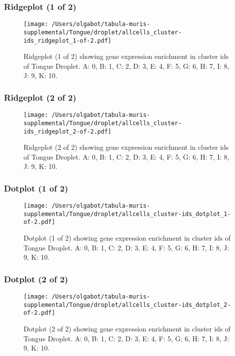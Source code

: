 \clearpage
\clearpage
\subsubsection{Ridgeplot (1 of 2)}
\begin{figure}[h]
\centering
\texttt{[image: /Users/olgabot/tabula-muris-supplemental/Tongue/droplet/allcells\_cluster-ids\_ridgeplot\_1-of-2.pdf]}

\caption{ Ridgeplot (1 of 2)  showing gene expression enrichment in cluster ids of Tongue Droplet. A: 0, B: 1, C: 2, D: 3, E: 4, F: 5, G: 6, H: 7, I: 8, J: 9, K: 10.}
\end{figure}


\clearpage
\clearpage
\subsubsection{Ridgeplot (2 of 2)}
\begin{figure}[h]
\centering
\texttt{[image: /Users/olgabot/tabula-muris-supplemental/Tongue/droplet/allcells\_cluster-ids\_ridgeplot\_2-of-2.pdf]}

\caption{ Ridgeplot (2 of 2)  showing gene expression enrichment in cluster ids of Tongue Droplet. A: 0, B: 1, C: 2, D: 3, E: 4, F: 5, G: 6, H: 7, I: 8, J: 9, K: 10.}
\end{figure}


\clearpage
\clearpage
\subsubsection{Dotplot (1 of 2)}
\begin{figure}[h]
\centering
\texttt{[image: /Users/olgabot/tabula-muris-supplemental/Tongue/droplet/allcells\_cluster-ids\_dotplot\_1-of-2.pdf]}

\caption{ Dotplot (1 of 2)  showing gene expression enrichment in cluster ids of Tongue Droplet. A: 0, B: 1, C: 2, D: 3, E: 4, F: 5, G: 6, H: 7, I: 8, J: 9, K: 10.}
\end{figure}


\clearpage
\clearpage
\subsubsection{Dotplot (2 of 2)}
\begin{figure}[h]
\centering
\texttt{[image: /Users/olgabot/tabula-muris-supplemental/Tongue/droplet/allcells\_cluster-ids\_dotplot\_2-of-2.pdf]}

\caption{ Dotplot (2 of 2)  showing gene expression enrichment in cluster ids of Tongue Droplet. A: 0, B: 1, C: 2, D: 3, E: 4, F: 5, G: 6, H: 7, I: 8, J: 9, K: 10.}
\end{figure}



